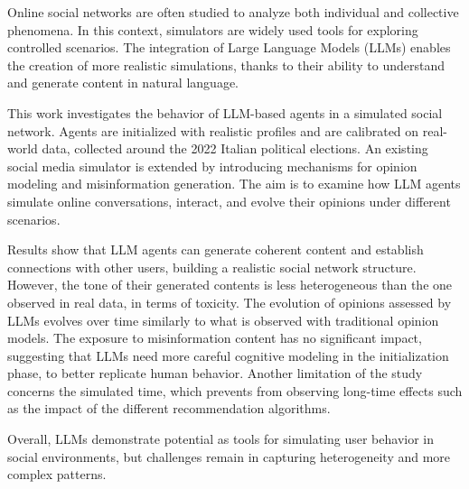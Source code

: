Online social networks are often studied to analyze both individual and collective phenomena. 
In this context, simulators are widely used tools for exploring controlled scenarios. 
The integration of Large Language Models (LLMs) enables the creation of more realistic simulations, thanks to their ability to understand and generate content in natural language.

This work investigates the behavior of LLM-based agents in a simulated social network.
Agents are initialized with realistic profiles and are calibrated on real-world data, collected around the 2022 Italian political elections.
An existing social media simulator is extended by introducing mechanisms for opinion modeling and misinformation generation.
The aim is to examine how LLM agents simulate online conversations, interact, and evolve their opinions under different scenarios.

Results show that LLM agents can generate coherent content and establish connections with other users, building a realistic social network structure. 
However, the tone of their generated contents is less heterogeneous than the one observed in real data, in terms of toxicity.
The evolution of opinions assessed by LLMs evolves over time similarly to what is observed with traditional opinion models.
The exposure to misinformation content has no significant impact, suggesting that LLMs need more careful cognitive modeling in the initialization phase, to better replicate human behavior.
Another limitation of the study concerns the simulated time, which prevents from observing long-time effects such as the impact of the different recommendation algorithms.

Overall, LLMs demonstrate potential as tools for simulating user behavior in social environments, but challenges remain in capturing heterogeneity and more complex patterns.